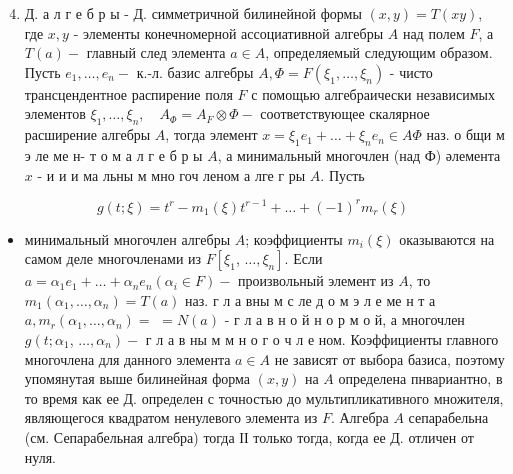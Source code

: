 \documentclass[10pt]{article}
\begin{document}
\begin{enumerate}

  \setcounter{enumi}{3}

  \item Д. а л г е б р ы - Д. симметричной билинейной формы $(x, y)=T(x y)$, где $x, y$ - элементы конечномерной ассоциативной алгебры $A$ над полем $F$, а $T(a)-$ главный след элемента $a \in A$, определяемый следующим образом. Пусть $e_{1}, \ldots, e_{n}-$ к.-л. базис алгебры $A, \Phi=F\left(\xi_{1}, \ldots, \xi_{n}\right)$ - чисто трансцендентное распирение поля $F$ с помощью алгебраически независимых элементов $\xi_{1}, \ldots, \xi_{n}, \quad A_{\Phi}=A_{F} \otimes \Phi-$ соответствующее скалярное расширение алгебры $A$, тогда элемент $x=\xi_{1} e_{1}+\ldots+\xi_{n} e_{n} \in A \Phi$ наз. о бщи м э ле ме н- т о м а л г е б р ы $A$, а минимальный многочлен (над Ф) әлемента $x$ - и и и ма льны м мно гоч леном а лге $\boldsymbol{г}$ ры $A$. Пусть

\end{enumerate}



\[

g(t ; \xi)=t^{r}-m_{1}(\xi) t^{r-1}+\ldots+(-1)^{r} m_{r}(\xi)

\]



\begin{itemize}

  \item минимальный многочлен алгебры $A$; коэффициенты $m_{i}(\xi)$ оказываются на самом деле многочленами из $F\left[\xi_{1}\right.$, $\left.\ldots, \xi_{n}\right]$. Если $a=\alpha_{1} e_{1}+\ldots+\alpha_{n} e_{n}\left(\alpha_{i} \in F\right)-$ произвольный элемент из $A$, то $m_{1}\left(\alpha_{1}, \ldots, \alpha_{n}\right)=T(a)$ наз. г л а вны м с ле д о м э л е ме н т а $a, m_{r}\left(\alpha_{1}, \ldots, \alpha_{n}\right)=$ $=N(a)$ - г л а в н о й н о р м о й, а многочлен $g\left(t ; \alpha_{1}\right.$, $\left.\ldots, \alpha_{n}\right)-$ г л а в ны м м н о г о ч л е ном. Коэффициенты главного многочлена для данного элемента $a \in A$ не зависят от выбора базиса, поэтому упомянутая выше билинейная форма $(x, y)$ на $A$ определена пнвариантно, в то время как ее Д. определен с точностью до мультипликативного множителя, являющегося квадратом ненулевого элемента из $F$. Алгебра $A$ сепарабельна (см. Сепарабельная алгебра) тогда ІІ только тогда, когда ее Д. отличен от нуля.

\end{itemize}
\end{document}
